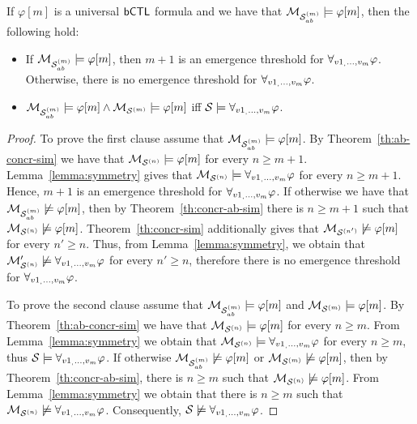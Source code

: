 \begin{corollary}
\label{cor:universal}
If $\varphi[m]$ is a universal $\sf{bCTL}$ formula and we have that $\mathcal{M}_{\mathcal{S}_{ab}^{(m)}}
\models  \varphi[m]$, then the following hold:
\begin{itemize}
    \item  If $\mathcal{M}_{\mathcal{S}_{ab}^{(m)}} \models \varphi[m]$, then $m + 1$ is an emergence
    threshold for $\forall_{v1_,\ldots,v_m} \varphi$. Otherwise, there is no emergence threshold for
    $\forall_{v1_,\ldots,v_m} \varphi$.
    \item $\mathcal{M}_{\mathcal{S}_{ab}^{(m)}} \models \varphi[m] \land \mathcal{M}_{\mathcal{S}^{(m)}} \models \varphi[m]$ iff
    $\mathcal S \models \forall_{v1_,\ldots,v_m} \varphi$.
\end{itemize}
\end{corollary}
\begin{proof}
To prove the first clause assume that $\mathcal{M}_{\mathcal{S}_{ab}^{(m)}} \models \varphi[m]$. By
Theorem~\ref{th:ab-concr-sim} we have that $\mathcal{M}_{\mathcal{S}^{(n)}} \models \varphi[m]$ for
every $n \geq m+1$. Lemma~\ref{lemma:symmetry} gives that  $\mathcal{M}_{\mathcal{S}^{(n)}} \models
\forall_{v1_,\ldots,v_m} \varphi$ for every $n \geq m+1$. Hence, $m+1$ is an emergence threshold for
$\forall_{v1_,\ldots,v_m} \varphi$. If otherwise we have that  $\mathcal{M}_{\mathcal{S}_{ab}^{(m)}} \not \models \varphi[m]$,
then by Theorem~\ref{th:concr-ab-sim} there is $n \geq m+1$ such that $\mathcal{M}_{\mathcal{S}^{(n)}}
\not \models \varphi[m]$. Theorem~\ref{th:concr-sim} additionally gives that
$\mathcal{M}_{\mathcal{S}^{(n')}} \not \models \varphi[m]$ for every $n' \geq n$. Thus, from
Lemma~\ref{lemma:symmetry}, we obtain that $\mathcal{M}_{\mathcal{S}^{(n)}}' \not \models \forall_{v1_,\ldots,v_m} \varphi$
for every $n' \geq n$, therefore there is no emergence threshold for
$\forall_{v1_,\ldots,v_m} \varphi$.

To prove the second clause assume that $\mathcal{M}_{\mathcal{S}_{ab}^{(m)}} \models \varphi[m]$ and $\mathcal{M}_{\mathcal{S}^{(m)}} \models \varphi[m]$. By Theorem~\ref{th:ab-concr-sim} we have that $\mathcal{M}_{\mathcal{S}^{(n)}}
\models \varphi[m]$ for every $n \geq m$. From Lemma~\ref{lemma:symmetry} we
obtain that $\mathcal{M}_{\mathcal{S}^{(n)}} \models \forall_{v1_,\ldots,v_m} \varphi$ for every $n \geq m$, thus $\mathcal S
\models \forall_{v1_,\ldots,v_m} \varphi$. If otherwise $\mathcal{M}_{\mathcal{S}_{ab}^{(m)}} \not \models \varphi[m]$ or $\mathcal{M}_{\mathcal{S}^{(m)}}
\not \models \varphi[m]$, then by Theorem~\ref{th:concr-ab-sim}, there is $n
\geq m$ such that $\mathcal{M}_{\mathcal{S}^{(n)}} \not \models \varphi[m]$.  From
Lemma~\ref{lemma:symmetry} we obtain that there is $n \geq m$ such that $\mathcal{M}_{\mathcal{S}^{(n)}}
\not \models \forall_{v1_,\ldots,v_m} \varphi$. Consequently, $\mathcal S \not \models \forall_{v1_,\ldots,v_m} \varphi$.
\end{proof}



